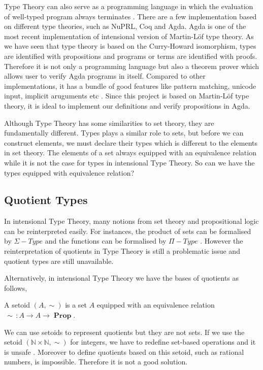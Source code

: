\documentclass[envcountsame]{llncs}
\newcommand{\N}{\mathbb{N}}
\DeclareMathOperator{\Prop}{\mathbf{Prop}}
\newcommand{\itt}{intensional Type Theory}
\newcommand{\mltt}{Martin-L\"{o}f type theory}
\begin{document}
Type Theory can also serve as a programming language in
which the evaluation of well-typed program always terminates
\cite{nor:90}. 
There are a few implementation based on different type theories, such as
NuPRL, Coq and Agda.
Agda is one of the most recent implementation of intensional version
of \mltt{}. As we have seen that type theory is based on the Curry-Howard
isomorphism, types are identified with propositions and programs or
terms are identified with proofs. Therefore it is not only a programming language but also a
theorem prover which allows user to verify Agda programs in
itself. Compared to other implementations, it has a bundle of good
features like pattern matching, unicode input, implicit aruguments etc
\cite{bov:09} . Since this project is based on \mltt{}, it is ideal to implement our definitions
and verify propositions in Agda.

Although Type Theory has some similarities to set theory, they are
fundamentally different. Types plays a similar role to sets, but
before we can construct elements, we must declare their
types which is different to the elements in set theory. The elements
of a set always equipped with an equivalence relation while it is not
the case for types in \itt{}. So can we have the types equipped with
equivalence relation? 

\subsection{Quotient Types}

In \itt{},  many notions from set theory and propositional logic can
be reinterpreted easily. For instances, the product of sets can be
formalised by $\Sigma-Type$ and the functions can be formalised by
$\Pi-Type$ \cite{nor:00}. However the reinterpretation of quotients in
Type Theory is still a problematic issue and quotient types are still unavailable.



Alternatively, in \itt{} we have the bases of quotients as follows,

\begin{definition}
A setoid $(A,\sim)$ is a set $A$ equipped with an equivalence relation ${\,\sim\,}\colon A \to A \to \Prop$.
\end{definition}

We can use setoids to represent quotients but they are not sets. If we
use the setoid $(\N \times \N, \sim)$ for integers, we have to
redefine set-based operations and it is unsafe \cite{aan}. Moreover to define quotients
based on this setoid, such as rational numbers, is
impossible. Therefore it is not a good solution.
\end{document}
